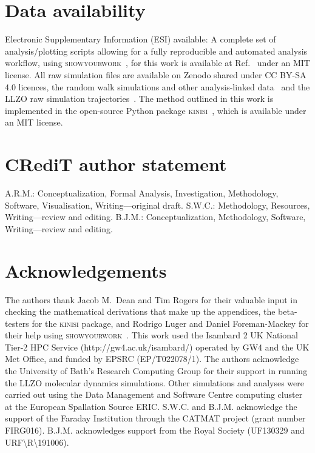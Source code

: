 \documentclass[reprint,superscriptaddress,nobibnotes,amsmath,amssymb,aps,prx,hidelinks]{revtex4-2}
\begin{document}
\section*{Data availability}

Electronic Supplementary Information (ESI) available: A complete set of analysis/plotting scripts allowing for a fully reproducible and automated analysis workflow, using \textsc{showyourwork}~\cite{luger_showyourwork_2021}, for this work is available at Ref.~\cite{mccluskey_github_2022} under an MIT license.
All raw simulation files are available on Zenodo shared under CC BY-SA 4.0 licences, the random walk simulations and other analysis-linked data~\cite{mccluskey_zenodo_2022} and the LLZO raw simulation trajectories~\cite{coles_llzo_zenodo_2022}.
The method outlined in this work is implemented in the open-source Python package \textsc{kinisi}~\cite{mccluskey_kinisi_2022}, which is available under an MIT license.

\section*{CR\lowercase{e}d\lowercase{i}T author statement}

A.R.M.: Conceptualization, Formal Analysis, Investigation, Methodology, Software, Visualisation, Writing---original draft.
S.W.C.: Methodology, Resources, Writing---review and editing.
B.J.M.: Conceptualization, Methodology, Software, Writing---review and editing.

\section*{Acknowledgements}

The authors thank Jacob M.\ Dean and Tim Rogers for their valuable input in checking the mathematical derivations that make up the appendices, the beta-testers for the \textsc{kinisi} package, and Rodrigo Luger and Daniel Foreman-Mackey for their help using \textsc{showyourwork}~\cite{luger_showyourwork_2021}.
This work used the Isambard 2 UK National Tier-2 HPC Service (http://gw4.ac.uk/isambard/) operated by GW4 and the UK Met Office, and funded by EPSRC (EP/T022078/1).
The authors acknowledge the University of Bath's Research Computing Group for their support in running the LLZO molecular dynamics simulations.
Other simulations and analyses were carried out using the Data Management and Software Centre computing cluster at the European Spallation Source ERIC.
S.W.C. and B.J.M. acknowledge the support of the Faraday Institution through the CATMAT project (grant number FIRG016). 
B.J.M. acknowledges support from the Royal Society (UF130329 and URF\textbackslash R\textbackslash 191006). 



\end{document}

